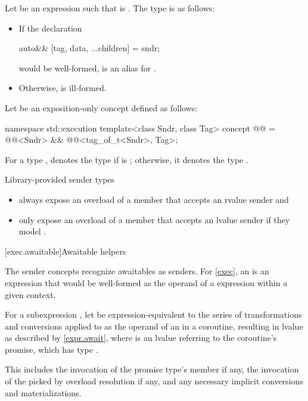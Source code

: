 \pnum
{}%
Let  be an expression
such that  is .
The type  is as follows:
\begin{itemize}
\item
If the declaration
\begin{codeblock}
auto&& [tag, data, ...children] = sndr;
\end{codeblock}
would be well-formed,  is
an alias for .
\item
Otherwise,  is ill-formed.
\end{itemize}

\pnum
Let  be an exposition-only concept defined as follows:
\begin{codeblock}
namespace std::execution {
  template<class Sndr, class Tag>
  concept @@ =
    @@<Sndr> &&
    @@<tag_of_t<Sndr>, Tag>;
}
\end{codeblock}

\pnum
For a type ,
 denotes the type 
if  is \cv{} ;
otherwise, it denotes the type .

\pnum
Library-provided sender types
\begin{itemize}
\item
always expose an overload of a member 
that accepts an rvalue sender and
\item
only expose an overload of a member 
that accepts an lvalue sender if they model .
\end{itemize}

[exec.awaitable]{Awaitable helpers}

\pnum
The sender concepts recognize awaitables as senders.
For \ref{exec}, an  is an expression
that would be well-formed as the operand of a  expression
within a given context.

\pnum
For a subexpression ,
let  be expression-equivalent to
the series of transformations and conversions applied to 
as the operand of an  in a coroutine,
resulting in lvalue  as described by \ref{expr.await},
where  is an lvalue referring to the coroutine's promise,
which has type .
\begin{note}
This includes the invocation of
the promise type's  member if any,
the invocation of the 
picked by overload resolution if any, and
any necessary implicit conversions and materializations.
\end{note}

